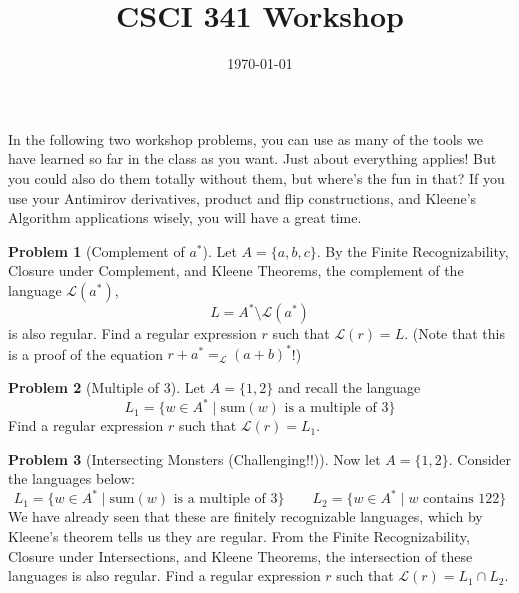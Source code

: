 \documentclass[11pt]{article}
\title{CSCI 341 Workshop \wshop}
\author{\subtitle}
\date{
    \today
}
\theoremstyle{theorem} %
\theoremstyle{definition} %
\newtheorem{problem}                    {{\color{BurntOrange}Problem}}
\theoremstyle{remark} %
\begin{document}
\maketitle


In the following two workshop problems, you can use as many of the tools we have learned so far in the class as you want.
Just about everything applies!
But you could also do them totally without them, but where's the fun in that?
If you use your Antimirov derivatives, product and flip constructions, and Kleene's Algorithm applications wisely, you will have a great time.

\begin{problem}[Complement of \(a^*\)]
    Let \(A = \{a, b, c\}\).
    By the Finite Recognizability, Closure under Complement, and Kleene Theorems, the complement of the language \(\mathcal L(a^*)\), 
    \[
        L = A^* \setminus \mathcal L(a^*)
    \]
    is also regular. 
    Find a regular expression \(r\) such that \(\mathcal L(r) = L\).
    (Note that this is a proof of the equation \(r + a^* =_{\mathcal L} (a + b)^*\)!)
\end{problem}

\pagebreak

\begin{problem}[Multiple of 3]
    Let \(A = \{1, 2\}\) and recall the language 
    \[
    L_1 = \{w \in A^* \mid \mathrm{sum}(w) \text{ is a multiple of \(3\)}\}
    \]
    Find a regular expression \(r\) such that \(\mathcal L(r) = L_1\).
\end{problem}

\pagebreak

\begin{problem}[Intersecting Monsters (Challenging!!)]
    Now let \(A = \{1, 2\}\). 
    Consider the languages below:
    \[
        L_1 = \{w \in A^* \mid \mathrm{sum}(w) \text{ is a multiple of \(3\)}\}
        \qquad
        L_2 = \{w \in A^* \mid w \text{ contains } 122\}
    \]
    We have already seen that these are finitely recognizable languages, which by Kleene's theorem tells us they are regular.
    From the Finite Recognizability, Closure under Intersections, and Kleene Theorems, the intersection of these languages is also regular.
    Find a regular expression \(r\) such that 
    \(
        \mathcal L(r) = L_1 \cap L_2
    \).
\end{problem}
\end{document}
